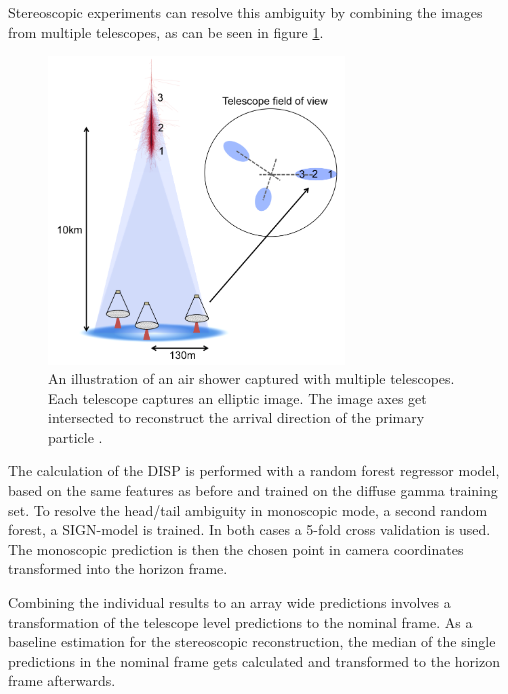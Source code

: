 Stereoscopic experiments can resolve this ambiguity by combining the images from 
multiple telescopes, as can be seen in figure \ref{fig:stereo_shower}.

\begin{figure}
	\centering
	\captionsetup{width=0.9\linewidth}
	\hspace*{0.1\textwidth}\includegraphics[width=0.7\textwidth]{images/stereo_shower.png}
	\caption{An illustration of an air shower captured with multiple telescopes.
		Each telescope captures an elliptic image.
		The image axes get intersected to reconstruct the arrival direction
		of the primary particle \cite{2015arXiv151005675H}.}
	\label{fig:stereo_shower}
\end{figure}



The calculation of the DISP is performed with a random
forest regressor model, based on the same features as before and
trained on the diffuse gamma training set.
To resolve the head/tail ambiguity in monoscopic mode,
a second random forest, a SIGN-model is trained.
In both cases a 5-fold cross validation is used.
The monoscopic prediction is then the chosen point in camera coordinates transformed
into the horizon frame.

Combining the individual results to an array wide predictions
involves a transformation of the telescope level predictions to
the nominal frame.
As a baseline estimation for the stereoscopic reconstruction,
the median of the single predictions in the nominal frame gets calculated
and transformed to the horizon frame afterwards.

